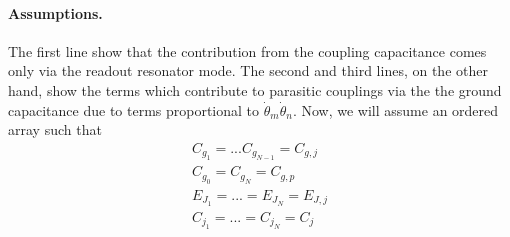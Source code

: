 \documentclass[%
reprint,
superscriptaddress,
 amsmath,amssymb,
 aps,
 prx,
longbibliography,
floatfix,
]{revtex4-2}
\begin{document}
\paragraph{Assumptions.} 
The first line show that the contribution from the coupling capacitance comes only via the readout resonator mode. The second and third lines, on the other hand, show the terms which contribute to parasitic couplings via the the ground capacitance due to terms proportional to $\dot{\theta}_m\dot{\theta}_n$. Now, we will assume an ordered array such that
\begin{align*}
    C_{g_1}=...C_{g_{N-1}}=C_{g,j} \\
    C_{g_0}=C_{g_N}=C_{g,p} \\
    E_{J_1}=...=E_{J_N}=E_{J,j} \\
    C_{j_1}=...=C_{j_N}=C_{j} 
\end{align*}
\end{document}
